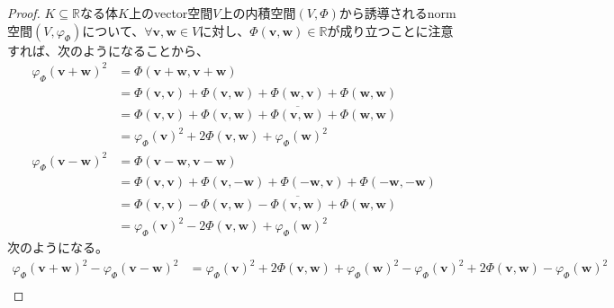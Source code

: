 \documentclass[dvipdfmx]{jsarticle}
\begin{document}
\begin{proof}
$K \subseteq \mathbb{R}$なる体$K$上のvector空間$V$上の内積空間$(V,\varPhi)$から誘導されるnorm空間$\left( V,\varphi_{\varPhi} \right)$について、$\forall\mathbf{v},\mathbf{w} \in V$に対し、$\varPhi\left( \mathbf{v},\mathbf{w} \right) \in \mathbb{R}$が成り立つことに注意すれば、次のようになることから、
\begin{align*}
{\varphi_{\varPhi}\left( \mathbf{v} + \mathbf{w} \right)}^{2} &= \varPhi\left( \mathbf{v} + \mathbf{w},\mathbf{v} + \mathbf{w} \right)\\
&= \varPhi\left( \mathbf{v},\mathbf{v} \right) + \varPhi\left( \mathbf{v},\mathbf{w} \right) + \varPhi\left( \mathbf{w},\mathbf{v} \right) + \varPhi\left( \mathbf{w},\mathbf{w} \right)\\
&= \varPhi\left( \mathbf{v},\mathbf{v} \right) + \varPhi\left( \mathbf{v},\mathbf{w} \right) + \overline{\varPhi\left( \mathbf{v},\mathbf{w} \right)} + \varPhi\left( \mathbf{w},\mathbf{w} \right)\\
&= {\varphi_{\varPhi}\left( \mathbf{v} \right)}^{2} + 2\varPhi\left( \mathbf{v},\mathbf{w} \right) + {\varphi_{\varPhi}\left( \mathbf{w} \right)}^{2}\\
{\varphi_{\varPhi}\left( \mathbf{v} - \mathbf{w} \right)}^{2} &= \varPhi\left( \mathbf{v} - \mathbf{w},\mathbf{v} - \mathbf{w} \right)\\
&= \varPhi\left( \mathbf{v},\mathbf{v} \right) + \varPhi\left( \mathbf{v}, - \mathbf{w} \right) + \varPhi\left( \mathbf{- w},\mathbf{v} \right) + \varPhi\left( \mathbf{- w}, - \mathbf{w} \right)\\
&= \varPhi\left( \mathbf{v},\mathbf{v} \right) - \varPhi\left( \mathbf{v},\mathbf{w} \right) - \overline{\varPhi\left( \mathbf{v},\mathbf{w} \right)} + \varPhi\left( \mathbf{w},\mathbf{w} \right)\\
&= {\varphi_{\varPhi}\left( \mathbf{v} \right)}^{2} - 2\varPhi\left( \mathbf{v},\mathbf{w} \right) + {\varphi_{\varPhi}\left( \mathbf{w} \right)}^{2}
\end{align*}
次のようになる。
\begin{align*}
{\varphi_{\varPhi}\left( \mathbf{v} + \mathbf{w} \right)}^{2} - {\varphi_{\varPhi}\left( \mathbf{v} - \mathbf{w} \right)}^{2} &= {\varphi_{\varPhi}\left( \mathbf{v} \right)}^{2} + 2\varPhi\left( \mathbf{v},\mathbf{w} \right) + {\varphi_{\varPhi}\left( \mathbf{w} \right)}^{2} - {\varphi_{\varPhi}\left( \mathbf{v} \right)}^{2} + 2\varPhi\left( \mathbf{v},\mathbf{w} \right) - {\varphi_{\varPhi}\left( \mathbf{w} \right)}^{2}\\

\end{align*}
\end{proof}
\end{document}
